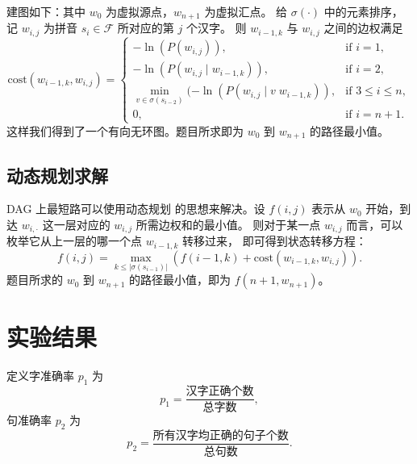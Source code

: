 \documentclass[UTF8]{ctexart}
\begin{document}
建图如下：其中 $w_0$ 为虚拟源点，$w_{n+1}$ 为虚拟汇点。
给 $\sigma(\cdot)$ 中的元素排序，
记 $w_{i, j}$ 为拼音 $s_i \in \mathcal{F}$ 所对应的第 $j$ 个汉字。
则 $w_{i-1, k}$ 与 $w_{i, j}$ 之间的边权满足
\begin{equation*}
\text{cost}(w_{i-1, k}, w_{i, j}) =
    \begin{cases}
        -\ln(P(w_{i, j})), & \text{if } i = 1, \\
        -\ln(P(w_{i, j}\mid w_{i-1, k})), & \text{if } i = 2, \\
        \min\limits_{v \in \sigma(s_{i-2})}(-\ln(P(w_{i, j}\mid v \; w_{i-1, k})), & \text{if } 3 \le i \le n, \\
        0, & \text{if } i=n+1.
    \end{cases}
\end{equation*}
这样我们得到了一个有向无环图。题目所求即为 $w_0$ 到 $w_{n+1}$ 的路径最小值。

\subsection{动态规划求解}

DAG 上最短路可以使用动态规划 \cite{DynamicProgramming} 的思想来解决。设 $f(i, j)$ 表示从 $w_0$ 开始，到达 $w_{i, \cdot}$ 这一层对应的 $w_{i, j}$ 所需边权和的最小值。
则对于某一点 $w_{i, j}$ 而言，可以枚举它从上一层的哪一个点 $w_{i-1, k}$ 转移过来，
即可得到状态转移方程：
\begin{equation*}
f(i, j) = \max_{k \le \left|\sigma(s_{i - 1})\right|}(f(i - 1, k) + \text{cost}(w_{i-1, k}, w_{i, j})).
\end{equation*}
题目所求的 $w_0$ 到 $w_{n+1}$ 的路径最小值，即为 $f(n+1, w_{n+1})$。

\section{实验结果}

定义字准确率 $p_1$ 为
\begin{equation*}
    p_1 = \frac{\text{汉字正确个数}}{\text{总字数}},
\end{equation*}
句准确率 $p_2$ 为
\begin{equation*}
    p_2 = \frac{\text{所有汉字均正确的句子个数}}{\text{总句数}}.
\end{equation*}
\end{document}
